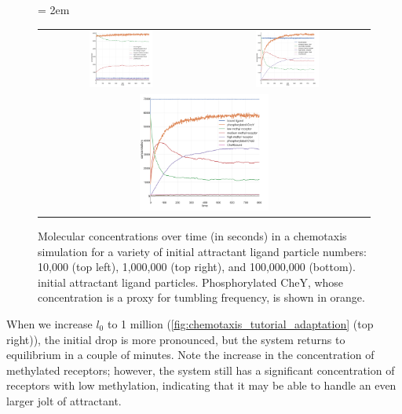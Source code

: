 \begin{figure}[h]
\centering
\mySfFamily
\tabcolsep = 2em
\begin{tabular}{c c}
\includegraphics[width = 0.4\textwidth]{../images/chemotaxis_tutorial_oneadd1e4_vscode.png} & 
\includegraphics[width = 0.4\textwidth]{../images/chemotaxis_tutorial_oneadd1e6_vscode.png}\\[1ex]
\multicolumn{2}{c}{\includegraphics[width = 0.4\textwidth]{../images/chemotaxis_tutorial_oneadd1e8_vscode.png}}
\end{tabular}
\caption{Molecular concentrations over time (in seconds) in a chemotaxis simulation for a variety of initial attractant ligand particle numbers: 10,000 (top left), 1,000,000 (top right), and 100,000,000 (bottom). initial attractant ligand particles. Phosphorylated CheY, whose concentration is a proxy for tumbling frequency, is shown in orange.}
\label{fig:chemotaxis_tutorial_adaptation}
\end{figure}

When we increase $l_0$ to 1 million (\autoref{fig:chemotaxis_tutorial_adaptation} (top right)), the initial drop is more pronounced, but the system returns  to equilibrium in a couple of minutes. Note the increase in the  concentration of methylated receptors; however, the system still has a significant concentration of receptors with low methylation, indicating that it may be able to handle an even larger jolt of attractant.

